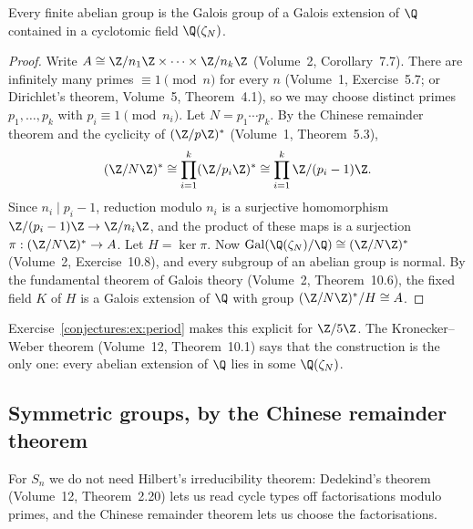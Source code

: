 \begin{theorem}\label{conjectures:thm:abelian}
Every finite abelian group is the Galois group of a Galois extension of $\Q$ contained in a cyclotomic field $\Q(\zeta_N)$.
\end{theorem}
\begin{proof}
Write $A\cong\Z/n_1\Z\times\dots\times\Z/n_k\Z$ (Volume~2, Corollary~7.7). There are infinitely many primes $\equiv1\pmod n$ for every $n$ (Volume~1,
Exercise~5.7; or Dirichlet's theorem, Volume~5, Theorem~4.1), so we may choose distinct primes $p_1,\dots,p_k$ with $p_i\equiv1\pmod{n_i}$. Let
$N=p_1\cdots p_k$. By the Chinese remainder theorem and the cyclicity of $(\Z/p\Z)^*$ (Volume~1, Theorem~5.3),
\[
(\Z/N\Z)^*\cong\prod_{i=1}^k(\Z/p_i\Z)^*\cong\prod_{i=1}^k\Z/(p_i-1)\Z.
\]
Since $n_i\mid p_i-1$, reduction modulo $n_i$ is a surjective homomorphism $\Z/(p_i-1)\Z\to\Z/n_i\Z$, and the product of these maps is a surjection
$\pi:(\Z/N\Z)^*\to A$. Let $H=\ker\pi$. Now $\operatorname{Gal}(\Q(\zeta_N)/\Q)\cong(\Z/N\Z)^*$ (Volume~2, Exercise~10.8), and every subgroup of an abelian
group is normal. By the fundamental theorem of Galois theory (Volume~2, Theorem~10.6), the fixed field $K$ of $H$ is a Galois extension of $\Q$ with group
$(\Z/N\Z)^*/H\cong A$.
\end{proof}

Exercise~\ref{conjectures:ex:period} makes this explicit for $\Z/5\Z$. The Kronecker--Weber theorem (Volume~12, Theorem~10.1) says that the construction is the only one:
every abelian extension of $\Q$ lies in some $\Q(\zeta_N)$.

\subsection*{Symmetric groups, by the Chinese remainder theorem}

For $S_n$ we do not need Hilbert's irreducibility theorem: Dedekind's theorem (Volume~12, Theorem~2.20) lets us read cycle types off factorisations modulo
primes, and the Chinese remainder theorem lets us choose the factorisations.


